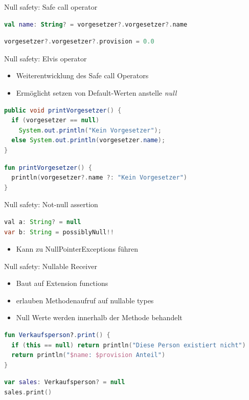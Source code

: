 \documentclass{beamer}
\begin{document}
\begin{frame}[fragile]{Null safety: Safe call operator}
  \begin{lstlisting}[language=Kotlin, title=Verkettung des Operators]
val name: String? = vorgesetzer?.vorgesetzer?.name   
  \end{lstlisting}
  \pause
  \begin{lstlisting}[language=Kotlin, title=Zuweisungen mit dem Operator]
vorgesetzer?.vorgesetzer?.provision = 0.0
  \end{lstlisting}
\end{frame}

\begin{frame}[fragile]{Null safety: Elvis operator}
  \begin{itemize}[<+->]
    \item Weiterentwicklung des Safe call Operators
    \item Ermöglicht setzen von Default-Werten anstelle \textit{null}
  \end{itemize}
  \pause
  \begin{lstlisting}[language=Java]
public void printVorgesetzer() {
  if (vorgesetzer == null)
    System.out.println("Kein Vorgesetzer");
  else System.out.println(vorgesetzer.name);
}   
  \end{lstlisting}
  \pause
  \begin{lstlisting}[language=Kotlin]
fun printVorgesetzer() {
  println(vorgesetzer?.name ?: "Kein Vorgesetzer")
}
  \end{lstlisting}
\end{frame}

\begin{frame}[fragile]{Null safety: Not-null assertion}
  \begin{lstlisting}[language=Java]
val a: String? = null
var b: String = possiblyNull!!
  \end{lstlisting}
  \pause
  \begin{itemize}[<+->]
    \item Kann zu NullPointerExceptions führen
  \end{itemize}
\end{frame}

\begin{frame}[fragile]{Null safety: Nullable Receiver}
  \begin{itemize}[<+->]
    \item Baut auf Extension functions
    \item erlauben Methodenaufruf auf nullable types
    \item Null Werte werden innerhalb der Methode behandelt
  \end{itemize}
  \pause \vspace{1cm}
  \begin{lstlisting}[language=Kotlin]
fun Verkaufsperson?.print() {
  if (this == null) return println("Diese Person existiert nicht")
  return println("$name: $provision Anteil")
}
  \end{lstlisting}
  \pause
  \begin{lstlisting}[language=Kotlin]
var sales: Verkaufsperson? = null
sales.print()
  \end{lstlisting}
\end{frame}
\end{document}
